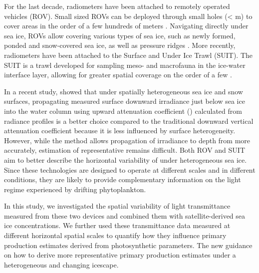 \DIFdelend \DIFaddbegin {}\DIFaddend For the last decade, radiometers have been attached to remotely operated vehicles (ROV). Small sized ROVs can be deployed through \DIFaddbegin {}\DIFaddend small holes (\textless\DIFaddbegin \DIFadd{~} m) to cover areas in the order of a few hundreds of meters \citep{Katlein2015, Katlein2017, Ambrose2005, Lund-Hansen2018, Nicolaus2010}. Navigating directly under sea ice, ROVs allow covering various types of sea ice, such as newly formed, ponded and snow-covered sea ice, as well as pressure ridges \citep{Katlein2017}. More recently, radiometers have been attached to the Surface and Under Ice Trawl (SUIT)\DIFdelbegin {}\DIFdelend . The SUIT is a trawl developed for sampling meso- and macrofauna in the ice-water interface layer, allowing for greater spatial coverage on the order of a few \DIFdelbegin {}\DIFdelend \DIFaddbegin {}\DIFaddend \citep{Flores2012, Lange2016, Lange2017}.

In a recent study, \citet{Massicotte2018} showed \DIFdelbegin \DIFdel{, }\DIFdelend that under spatially heterogeneous sea ice and snow surfaces, propagating measured surface downward irradiance just below sea ice \edzerominus{} into the water column using upward attenuation coefficient (\klu{}) calculated from radiance profiles is a better choice compared to the traditional downward vertical attenuation coefficient \DIFaddbegin \DIFadd{(}\DIFaddend \ked{}\DIFaddbegin \DIFadd{), }\DIFaddend because it is less influenced by surface heterogeneity. However, while the method allows propagation of irradiance to depth from \edzerominus{} more accurately, estimation of representative \edzerominus{} remains difficult. Both ROV and SUIT aim to better describe the horizontal variability of \edzerominus{} under heterogeneous sea ice. Since these technologies are designed to operate at different scales and in different conditions, they are likely to provide complementary information on the light regime experienced by drifting phytoplankton.
\DIFaddbegin 

\DIFaddend In this study, we investigated the spatial variability of light transmittance measured from these two devices and combined them with satellite-derived sea ice concentrations. We further used these transmittance data measured at different horizontal spatial scales to quantify how they influence primary production estimates derived from photosynthetic parameters. The \DIFdelbegin {}\DIFdelend \DIFaddbegin {}\DIFaddend new guidance on how to derive more representative primary production estimates under a heterogeneous and changing icescape.